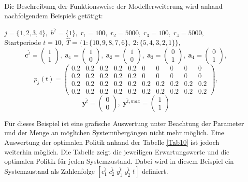 Die Beschreibung der Funktionsweise der Modellerweiterung wird anhand nachfolgendem Beispiels getätigt:
\begin{center}
$j = \{1, 2, 3, 4\}, \; h^{\hat{t}} = \{1\}, \; r_{1} = 100, \; r_{2} = 5000, \; r_{3} = 100, \; r_{4} = 5000,$ \\
$\text{Startperiode } t=10, \; \hat{T}= \{1: \{10,9,8,7,6\},\; 2: \{5,4,3,2,1\}\}  $,
\[\textbf{c}^{\hat{t}}=\begin{pmatrix} 1\\ 1  \end{pmatrix}, \;
    \textbf{a}_1=\begin{pmatrix} 1\\ 0  \end{pmatrix}, \;
\textbf{a}_2=\begin{pmatrix} 1\\ 0  \end{pmatrix}, \;
\textbf{a}_3=\begin{pmatrix} 0\\ 1  \end{pmatrix}, \;
\textbf{a}_4=\begin{pmatrix} 0\\ 1  \end{pmatrix}, \]
         \[ p_{j}(t)=
       \begin{pmatrix}
       0.2 & 0.2 & 0.2 & 0.2 & 0.2 & 0 & 0 & 0 & 0 & 0\\
       0.2 & 0.2 & 0.2 & 0.2 & 0.2 & 0 & 0 & 0 & 0 & 0\\
       0.2 & 0.2 & 0.2 & 0.2 & 0.2 & 0.2 & 0.2 & 0.2 & 0.2 & 0.2\\
       0.2 & 0.2 & 0.2 & 0.2 & 0.2 & 0.2 & 0.2 & 0.2 & 0.2 & 0.2
\end{pmatrix}, 
  \]
  \[
    \textbf{y}^{\hat{t}}= \begin{pmatrix} 0\\ 0\end{pmatrix}, \;
    \textbf{y}^{\hat{t},max}=\begin{pmatrix} 1\\ 1  \end{pmatrix}
      \]
\end{center}

Für dieses Beispiel ist eine grafische Auswertung unter Beachtung der Parameter und der Menge an möglichen Systemübergängen nicht mehr möglich. Eine Auswertung der optimalen Politik anhand der Tabelle \ref{Tab10} ist jedoch weiterhin möglich. Die Tabelle zeigt die jeweiligen Erwartungswerte und die optimalen Politik für jeden Systemzustand. Dabei wird in diesem Beispiel ein Systemzustand als Zahlenfolge $[c_1^{\hat t}\;c_2^{\hat t}\;y_1^{\hat t}\;y_2^{\hat t}\;t]$ definiert.

